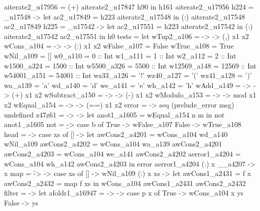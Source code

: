                                       aiterate2_u17956 = (+) aiterate2_u17847 h90
                                     in h161 aiterate2_u17956
         h224 = _u17548 -> let ac2_u17849 = h223 aiterate2_u17548
                                     in (:) aiterate2_u17548 ac2_u17849
         h225 = _u17542 -> let ac2_u17551 = h223 aiterate2_u17542
                                     in (:) aiterate2_u17542 ac2_u17551
       in h0
tests = let
          wTup2_a106 =  ->  -> (,) x1 x2
          wCons_a104 =  ->  -> (:) x1 x2
          wFalse_a107 = False
          wTrue_a108 = True
          wNil_a109 = []
          w0_a110 = 0 :: Int
          w1_a111 = 1 :: Int
          w2_a112 = 2 :: Int
          w1500_a324 = 1500 :: Int
          w5500_a326 = 5500 :: Int
          w12569_a148 = 12569 :: Int
          w54001_a151 = 54001 :: Int
          wz33_a126 = '!'
          wz40_a127 = '('
          wz41_a128 = ')'
          wa_a139 = 'a'
          wd_a140 = 'd'
          we_a141 = 'e'
          wh_a142 = 'h'
          wAdd_a149 =  ->  -> (+) x1 x2
          wSubtract_a150 =  ->  -> (-) x1 x2
          wModulo_a153 =  ->  -> mod x1 x2
          wEqual_a154 =  ->  -> (==) x1 x2
          error = \msg -> seq (prelude_error msg) undefined
          z47z61 = \n -> \m -> let anot1_a1605 = wEqual_a154 n m
                               in not anot1_a1605
          not = \b -> case b of
                        True -> wFalse_a107
                        False -> wTrue_a108
          head = \xs -> case xs of
                          [] ->
                            let
                              awCons2_a4201 = wCons_a104 wd_a140 wNil_a109
                              awCons2_a4202 = wCons_a104 wa_a139 awCons2_a4201
                              awCons2_a4203 = wCons_a104 we_a141 awCons2_a4202
                              aerror1_a4204 = wCons_a104 wh_a142 awCons2_a4203
                            in error aerror1_a4204
                          (:) x __a4207 -> x
          map = \f -> \xs -> case xs of
                               [] -> wNil_a109
                               (:) x xs ->
                                 let
                                   awCons1_a2431 = f x
                                   awCons2_a2432 = map f xs
                                 in wCons_a104 awCons1_a2431 awCons2_a2432
          filter = \p -> let
                           afoldr1_a16947 = \x -> \ys -> case p x of
                                                           True -> wCons_a104 x ys
                                                           False -> ys
